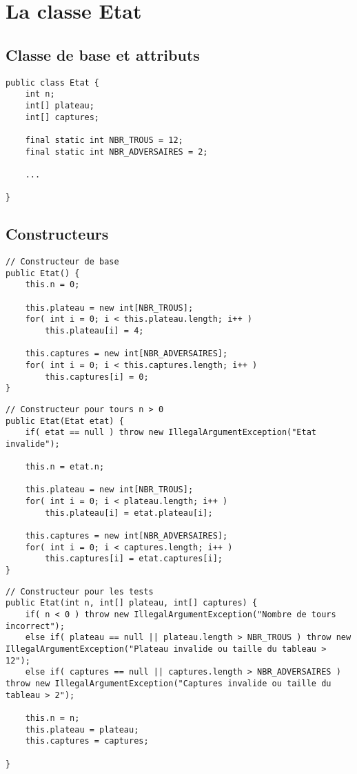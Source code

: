 \documentclass[11pt,a4paper]{report}
\begin{document}
\chapter{La classe Etat}
\section{Classe de base et attributs}
\begin{lstlisting}
public class Etat {
    int n;
    int[] plateau;
    int[] captures;

    final static int NBR_TROUS = 12;
    final static int NBR_ADVERSAIRES = 2;

    ...

}
\end{lstlisting}

\section{Constructeurs}
\begin{lstlisting}
// Constructeur de base
public Etat() {
    this.n = 0;

    this.plateau = new int[NBR_TROUS];
    for( int i = 0; i < this.plateau.length; i++ )
        this.plateau[i] = 4;

    this.captures = new int[NBR_ADVERSAIRES];
    for( int i = 0; i < this.captures.length; i++ )
        this.captures[i] = 0;
}
\end{lstlisting}

\newpage

\begin{lstlisting}
// Constructeur pour tours n > 0
public Etat(Etat etat) {
    if( etat == null ) throw new IllegalArgumentException("Etat invalide");

    this.n = etat.n;

    this.plateau = new int[NBR_TROUS];
    for( int i = 0; i < plateau.length; i++ )
        this.plateau[i] = etat.plateau[i];

    this.captures = new int[NBR_ADVERSAIRES];
    for( int i = 0; i < captures.length; i++ )
        this.captures[i] = etat.captures[i];
}
\end{lstlisting}

\begin{lstlisting}
// Constructeur pour les tests
public Etat(int n, int[] plateau, int[] captures) {
    if( n < 0 ) throw new IllegalArgumentException("Nombre de tours incorrect");
    else if( plateau == null || plateau.length > NBR_TROUS ) throw new IllegalArgumentException("Plateau invalide ou taille du tableau > 12");
    else if( captures == null || captures.length > NBR_ADVERSAIRES ) throw new IllegalArgumentException("Captures invalide ou taille du tableau > 2");

    this.n = n;
    this.plateau = plateau;
    this.captures = captures;

}
\end{lstlisting}
\end{document}
